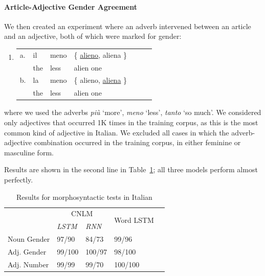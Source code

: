\paragraph{Article-Adjective Gender Agreement}
We then created an experiment where an adverb intervened between an article and an adjective, both of which were marked for gender:
\begin{enumerate}[label={(\arabic*)}]
	\item 
		\begin{tabular}[t]{lllllll}
	a. & il & meno & \{ \underline{alieno}, aliena \} \\
   &  the & less & alien one  \\
	b. & la & meno & \{ alieno, \underline{aliena} \} \\
    &the & less & alien one \\
\end{tabular}
\end{enumerate}
where we used the adverbs \emph{pi{\`u}} `more', \emph{meno} `less', \emph{tanto} `so much'.
We considered only adjectives that occurred 1K times in the training corpus, as this is the most common kind of adjective in Italian.
We excluded all cases in which the adverb-adjective combination occurred in the training corpus, in either feminine or masculine form.



Results are shown in the second line in Table~\ref{tab:ital-agr-results}; all three models perform almost perfectly.

\begin{table}[t]
  \begin{center}
    \begin{tabular}{l|l|l|l|l}
	    & \multicolumn{2}{c|}{CNLM} & \multirow{2}{*}{Word LSTM}\\
  &\emph{LSTM}&\emph{RNN}&\\ \hline
	    Noun Gender & 97/90  & 84/73 & 99/96 \\
	    Adj. Gender & 99/100 & 100/97 & 98/100 \\
	    Adj. Number & 99/99 & 99/70 & 100/100 \\
    \end{tabular}
  \end{center}
  \caption{\label{tab:ital-agr-results} Results for morphosyntactic tests in Italian}
\end{table}

